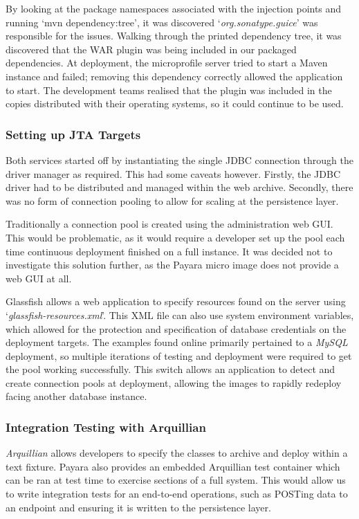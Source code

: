 By looking at the package namespaces associated with the injection points and running `mvn dependency:tree', it was discovered `\textit{org.sonatype.guice}' was responsible for the issues. Walking through the printed dependency tree, it was discovered that the WAR plugin was being included in our packaged dependencies. At deployment, the microprofile server tried to start a Maven instance and failed; removing this dependency correctly allowed the application to start. The development teams realised that the plugin was included in the copies distributed with their operating systems, so it could continue to be used.

\label{JTA_Targets}
\subsubsection{Setting up JTA Targets}
Both services started off by instantiating the single JDBC connection through the driver manager as required. This had some caveats however. Firstly, the JDBC driver had to be distributed and managed within the web archive. Secondly, there was no form of connection pooling to allow for scaling at the persistence layer.

Traditionally a connection pool is created using the administration web GUI. This would be problematic, as it would require a developer set up the pool each time continuous deployment finished on a full instance.  It was decided not to investigate this solution further, as the Payara micro image does not provide a web GUI at all.

Glassfish allows a web application to specify resources found on the server using `\textit{glassfish-resources.xml}'. This XML file can also use system environment variables, which allowed for the protection and specification of database credentials on the deployment targets. The examples found online primarily pertained to a \textit{MySQL} deployment, so multiple iterations of testing and deployment were required to get the pool working successfully. This switch allows an application to detect and create connection pools at deployment, allowing the images to rapidly redeploy facing another database instance.

\subsubsection{Integration Testing with Arquillian}
\textit{Arquillian}\cite{Arquillian} allows developers to specify the classes to archive and deploy within a text fixture. Payara also provides an embedded Arquillian test container which can be ran at test time to exercise sections of a full system. This would allow us to write integration tests for an end-to-end operations, such as POSTing data to an endpoint and ensuring it is written to the persistence layer.

